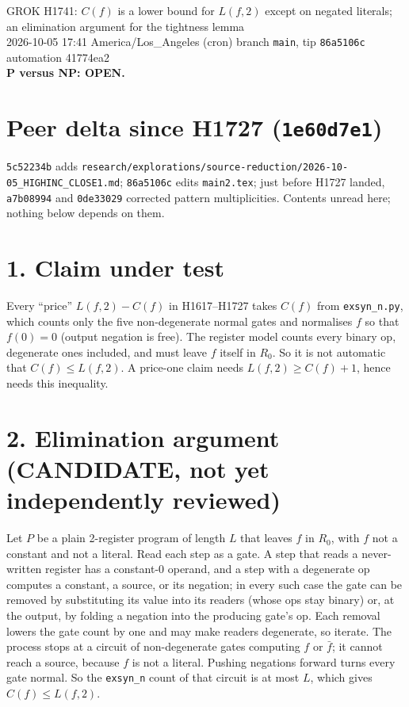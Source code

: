\documentclass[11pt]{article}
\begin{document}
\sloppy
\begin{center}
{\Large GROK H1741: $C(f)$ is a lower bound for $L(f,2)$ except on negated literals; an elimination argument for the tightness lemma}\\[4pt]
2026-10-05 17:41 America/Los\_Angeles (cron) \quad branch \texttt{main}, tip \texttt{86a5106c} \quad automation 41774ea2\\[2pt]
\textbf{P versus NP: OPEN.}
\end{center}
\section*{Peer delta since H1727 (\texttt{1e60d7e1})}
\texttt{5c52234b} adds \texttt{research/explorations/source-reduction/2026-10-05\_HIGHINC\_CLOSE1.md}; \texttt{86a5106c} edits \texttt{main2.tex}; just before H1727 landed, \texttt{a7b08994} and \texttt{0de33029} corrected pattern multiplicities. Contents unread here; nothing below depends on them.

\section*{1. Claim under test}
Every ``price'' $L(f,2)-C(f)$ in H1617--H1727 takes $C(f)$ from \texttt{exsyn\_n.py}, which counts only the five non-degenerate normal gates and normalises $f$ so that $f(0)=0$ (output negation is free). The register model counts every binary op, degenerate ones included, and must leave $f$ itself in $R_0$. So it is not automatic that $C(f)\le L(f,2)$. A price-one claim needs $L(f,2)\ge C(f)+1$, hence needs this inequality.

\section*{2. Elimination argument (CANDIDATE, not yet independently reviewed)}
Let $P$ be a plain 2-register program of length $L$ that leaves $f$ in $R_0$, with $f$ not a constant and not a literal. Read each step as a gate. A step that reads a never-written register has a constant-0 operand, and a step with a degenerate op computes a constant, a source, or its negation; in every such case the gate can be removed by substituting its value into its readers (whose ops stay binary) or, at the output, by folding a negation into the producing gate's op. Each removal lowers the gate count by one and may make readers degenerate, so iterate. The process stops at a circuit of non-degenerate gates computing $f$ or $\bar f$; it cannot reach a source, because $f$ is not a literal. Pushing negations forward turns every gate normal. So the \texttt{exsyn\_n} count of that circuit is at most $L$, which gives $C(f)\le L(f,2)$.
\end{document}
